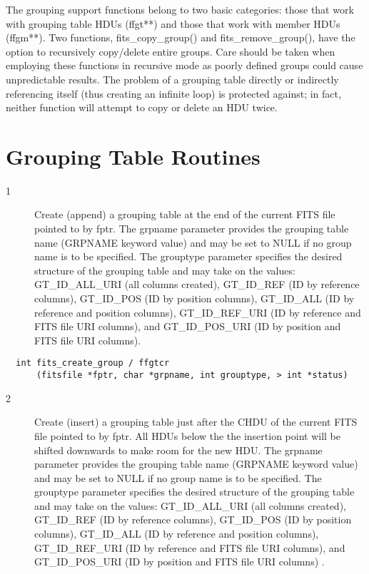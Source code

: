 \documentclass[11pt]{book}
\begin{document}
The grouping support functions belong to two basic categories: those that
work with grouping table HDUs (ffgt**) and those that work with member HDUs
(ffgm**). Two functions, fits\_copy\_group() and fits\_remove\_group(), have the
option to recursively copy/delete entire groups. Care should be taken when
employing these functions in recursive mode as poorly defined groups could
cause unpredictable results. The problem of a grouping table directly or
indirectly referencing itself (thus creating an infinite loop) is protected
against; in fact, neither function will attempt to copy or delete an HDU
twice.


\section{Grouping Table Routines}


\begin{description}
\item[1 ]Create (append) a grouping table at the end of the current FITS file
   pointed to by fptr. The grpname parameter provides the grouping table
   name (GRPNAME keyword value) and may be set to NULL if no group name
   is to be specified. The grouptype parameter specifies the desired
   structure of the grouping table and may take on the values:
   GT\_ID\_ALL\_URI (all columns created), GT\_ID\_REF (ID by reference columns),
   GT\_ID\_POS (ID by position columns), GT\_ID\_ALL (ID by reference and
   position columns), GT\_ID\_REF\_URI (ID by reference and FITS file URI
  columns), and GT\_ID\_POS\_URI (ID by position and FITS file URI columns). \label{ffgtcr}
\end{description}

\begin{verbatim}
  int fits_create_group / ffgtcr
      (fitsfile *fptr, char *grpname, int grouptype, > int *status)
\end{verbatim}

\begin{description}
\item[2 ]Create (insert) a grouping table just after the CHDU of the current FITS
   file pointed to by fptr. All HDUs below the the insertion point will be
   shifted downwards to make room for the new HDU. The grpname parameter
   provides the grouping table name (GRPNAME keyword value) and may be set to
   NULL if no group name is to be specified. The grouptype parameter specifies
   the desired structure of the grouping table and may take on the values:
   GT\_ID\_ALL\_URI (all columns created), GT\_ID\_REF (ID by reference columns),
   GT\_ID\_POS (ID by position columns), GT\_ID\_ALL (ID by reference and
   position columns), GT\_ID\_REF\_URI (ID by reference and FITS file URI
  columns), and GT\_ID\_POS\_URI (ID by position and FITS file URI columns) \label{ffgtis}.
\end{description}
\end{document}
